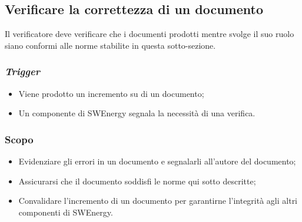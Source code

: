 \subsection{Verificare la correttezza di un documento}
\label{verifica-documento}

Il verificatore deve verificare che i documenti prodotti mentre svolge il suo
ruolo siano conformi alle norme stabilite in questa sotto-sezione.

\subsubsection{\textit{Trigger}}
\begin{itemize}
	\item Viene prodotto un incremento su di un documento;

	\item Un componente di SWEnergy segnala la necessità di una verifica.
\end{itemize}

\subsubsection{Scopo}
\begin{itemize}
	\item Evidenziare gli errori in un documento e segnalarli all'autore del
	      documento;

	\item Assicurarsi che il documento soddisfi le norme qui sotto descritte;

	\item Convalidare l'incremento di un documento per garantirne l'integrità
	      agli altri componenti di SWEnergy.
\end{itemize}

